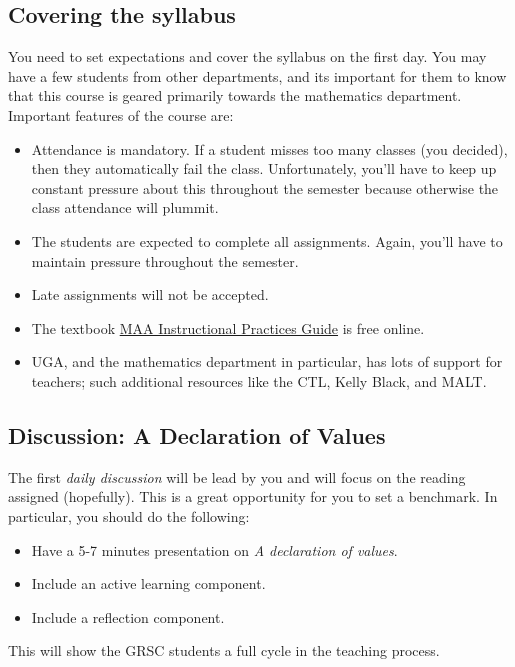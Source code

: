 \subsection{Covering the syllabus}
\label{sec:covering-syllabus}

You need to set expectations and cover the syllabus on the first day.  You may have a few students from other departments, and its important for them to know that this course is geared primarily towards the mathematics department.  Important features of the course are:

\begin{itemize}
\item Attendance is mandatory.  If a student misses too many classes (you decided), then they automatically fail the class.  Unfortunately, you'll have to keep up constant pressure about this throughout the semester because otherwise the class attendance will plummit.
\item The students are expected to complete all assignments.  Again, you'll have to maintain pressure throughout the semester.
\item Late assignments will not be accepted.
\item The textbook \href{https://www.maa.org/sites/default/files/InstructPracGuide_web.pdf}{MAA Instructional Practices Guide} is free online.
\item UGA, and the mathematics department in particular, has lots of support for teachers; such additional resources like the CTL, Kelly Black, and MALT.
\end{itemize}

\subsection{Discussion: A Declaration of Values}
\label{sec:disc-decl-valu-1}

The first \emph{daily discussion} will be lead by you and will focus on the reading assigned (hopefully).  This is a great opportunity for you to set a benchmark.  In particular, you should do the following:
\begin{itemize}
\item Have a 5-7 minutes presentation on \emph{A declaration of values}.
\item Include an active learning component.
\item Include a reflection component.
\end{itemize}

This will show the GRSC students a full cycle in the teaching process.


